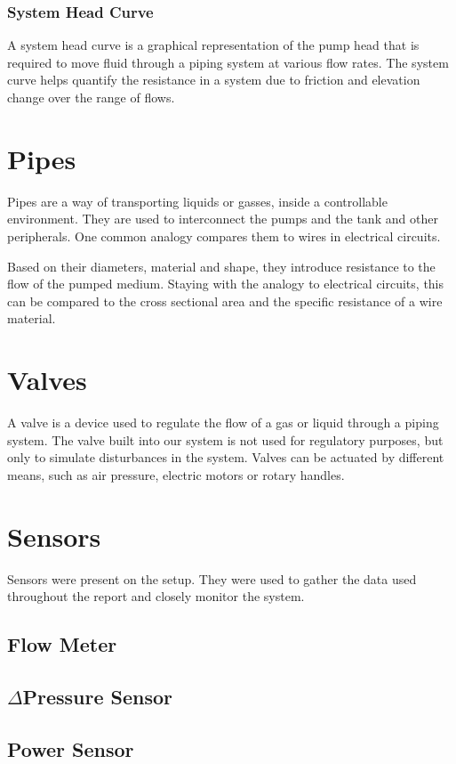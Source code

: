 \subsubsection{System Head Curve}
A system head curve is a graphical representation of the pump head that is required 
to move fluid through a piping system at various flow rates.
The system curve helps quantify the resistance in a system due to friction and 
elevation change over the range of flows.



\section{Pipes}
Pipes are a way of transporting liquids or gasses, inside a controllable environment.
They are used to interconnect the pumps and the tank and other peripherals.
One common analogy compares them to wires in electrical circuits.

Based on their diameters, material and shape,
they introduce resistance to the flow of the pumped medium.
Staying with the analogy to electrical circuits,
this can be compared to the cross sectional area and the specific resistance of a wire material.

\section{Valves}
A valve is a device used to regulate the flow of a gas or liquid through a piping system.
The valve built into our system is not used for regulatory purposes,
but only to simulate disturbances in the system.
Valves can be actuated by different means, such as air pressure, electric motors or rotary handles.

\section{Sensors}
Sensors were present on the setup. They were used to gather the data used throughout the report 
and closely monitor the system.

\subsection{Flow Meter}
\subsection{$\Delta$Pressure Sensor}
\subsection{Power Sensor}

